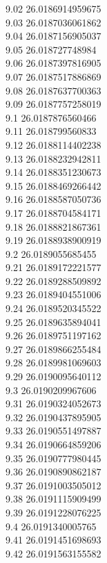 {9.02	26.0186914959675\\
9.03	26.0187036061862\\
9.04	26.0187156905037\\
9.05	26.018727748984\\
9.06	26.0187397816905\\
9.07	26.0187517886869\\
9.08	26.0187637700363\\
9.09	26.0187757258019\\
9.1	26.0187876560466\\
9.11	26.018799560833\\
9.12	26.0188114402238\\
9.13	26.0188232942811\\
9.14	26.0188351230673\\
9.15	26.0188469266442\\
9.16	26.0188587050736\\
9.17	26.0188704584171\\
9.18	26.0188821867361\\
9.19	26.0188938900919\\
9.2	26.0189055685455\\
9.21	26.0189172221577\\
9.22	26.0189288509892\\
9.23	26.0189404551006\\
9.24	26.0189520345522\\
9.25	26.0189635894041\\
9.26	26.0189751197162\\
9.27	26.0189866255484\\
9.28	26.0189981069603\\
9.29	26.0190095640112\\
9.3	26.0190209967606\\
9.31	26.0190324052673\\
9.32	26.0190437895905\\
9.33	26.0190551497887\\
9.34	26.0190664859206\\
9.35	26.0190777980445\\
9.36	26.0190890862187\\
9.37	26.0191003505012\\
9.38	26.0191115909499\\
9.39	26.0191228076225\\
9.4	26.0191340005765\\
9.41	26.0191451698693\\
9.42	26.0191563155582\\
}
